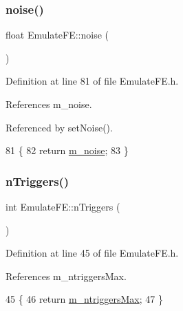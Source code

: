 \subsubsection{\texorpdfstring{noise()}{noise()}}
{\footnotesize\ttfamily float Emulate\+F\+E\+::noise (\begin{DoxyParamCaption}{ }\end{DoxyParamCaption})\hspace{0.3cm}{\ttfamily [inline]}}



Definition at line 81 of file Emulate\+F\+E.\+h.



References m\+\_\+noise.



Referenced by set\+Noise().


\begin{DoxyCode}
81                \{
82     \textcolor{keywordflow}{return} \hyperlink{classEmulateFE_a74f8720a1da5806fad3811339ef9b98f}{m\_noise};
83   \}
\end{DoxyCode}
\mbox{\label{classEmulateFE_ab08924ef9529a766ce80c9c1c9885cca}} 
\subsubsection{\texorpdfstring{n\+Triggers()}{nTriggers()}}
{\footnotesize\ttfamily int Emulate\+F\+E\+::n\+Triggers (\begin{DoxyParamCaption}{ }\end{DoxyParamCaption})\hspace{0.3cm}{\ttfamily [inline]}}



Definition at line 45 of file Emulate\+F\+E.\+h.



References m\+\_\+ntriggers\+Max.


\begin{DoxyCode}
45                  \{
46     \textcolor{keywordflow}{return} \hyperlink{classEmulateFE_a2d473d12faf30f4870458874d70c7f55}{m\_ntriggersMax};
47   \}
\end{DoxyCode}
\mbox{\label{classEmulateFE_a8442db97da7b2a97fe97745e6d8d9161}} 
